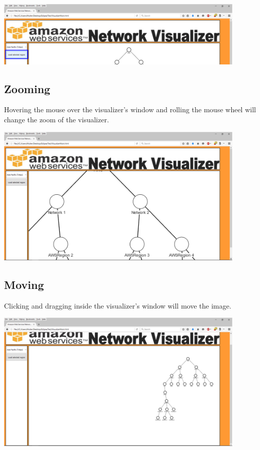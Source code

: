 \documentclass[hidelinks,a4paper,12pt]{article}
\begin{document}
		\includegraphics[width=0.9\textwidth]{./images/Visualizer4.png}

	\subsection{Zooming}
	Hovering the mouse over the visualizer's window and rolling the mouse wheel will change the zoom of the visualizer. 
	
	\includegraphics[width=0.9\textwidth]{./images/Visualizer5.png}
	\newpage

	\subsection{Moving}
	Clicking and dragging inside the visualizer's window will move the image.
	
	\includegraphics[width=0.9\textwidth]{./images/Visualizer6.png}
\end{document}
